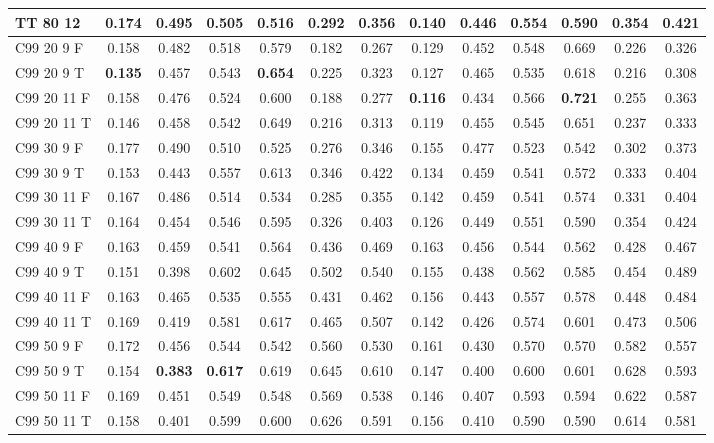 \documentclass{article}
\begin{document}
\begin{longtable}[c]{|l|c|c|c|c|c|c||c|c|c|c|c|c|}
TT 80 12 & 0.174 & 0.495 & 0.505 & 0.516 & 0.292 & 0.356 & 0.140 & 0.446 & 0.554 & 0.590 & 0.354 & 0.421\\ \hline\hline
C99 20  9 F & 0.158 & 0.482 & 0.518 & 0.579 & 0.182 & 0.267 & 0.129 & 0.452 & 0.548 & 0.669 & 0.226 & 0.326\\ \hline
C99 20  9 T & \textbf{0.135} & 0.457 & 0.543 & \textbf{0.654} & 0.225 & 0.323 & 0.127 & 0.465 & 0.535 & 0.618 & 0.216 & 0.308\\ \hline
C99 20 11 F & 0.158 & 0.476 & 0.524 & 0.600 & 0.188 & 0.277 & \textbf{0.116} & 0.434 & 0.566 & \textbf{0.721} & 0.255 & 0.363\\ \hline
C99 20 11 T & 0.146 & 0.458 & 0.542 & 0.649 & 0.216 & 0.313 & 0.119 & 0.455 & 0.545 & 0.651 & 0.237 & 0.333\\ \hline
C99 30  9 F & 0.177 & 0.490 & 0.510 & 0.525 & 0.276 & 0.346 & 0.155 & 0.477 & 0.523 & 0.542 & 0.302 & 0.373\\ \hline
C99 30  9 T & 0.153 & 0.443 & 0.557 & 0.613 & 0.346 & 0.422 & 0.134 & 0.459 & 0.541 & 0.572 & 0.333 & 0.404\\ \hline
C99 30 11 F & 0.167 & 0.486 & 0.514 & 0.534 & 0.285 & 0.355 & 0.142 & 0.459 & 0.541 & 0.574 & 0.331 & 0.404\\ \hline
C99 30 11 T & 0.164 & 0.454 & 0.546 & 0.595 & 0.326 & 0.403 & 0.126 & 0.449 & 0.551 & 0.590 & 0.354 & 0.424\\ \hline
C99 40  9 F & 0.163 & 0.459 & 0.541 & 0.564 & 0.436 & 0.469 & 0.163 & 0.456 & 0.544 & 0.562 & 0.428 & 0.467\\ \hline
C99 40  9 T & 0.151 & 0.398 & 0.602 & 0.645 & 0.502 & 0.540 & 0.155 & 0.438 & 0.562 & 0.585 & 0.454 & 0.489\\ \hline
C99 40 11 F & 0.163 & 0.465 & 0.535 & 0.555 & 0.431 & 0.462 & 0.156 & 0.443 & 0.557 & 0.578 & 0.448 & 0.484\\ \hline
C99 40 11 T & 0.169 & 0.419 & 0.581 & 0.617 & 0.465 & 0.507 & 0.142 & 0.426 & 0.574 & 0.601 & 0.473 & 0.506\\ \hline
C99 50  9 F & 0.172 & 0.456 & 0.544 & 0.542 & 0.560 & 0.530 & 0.161 & 0.430 & 0.570 & 0.570 & 0.582 & 0.557\\ \hline
C99 50  9 T & 0.154 & \textbf{0.383} & \textbf{0.617} & 0.619 & 0.645 & 0.610 & 0.147 & 0.400 & 0.600 & 0.601 & 0.628 & 0.593\\ \hline
C99 50 11 F & 0.169 & 0.451 & 0.549 & 0.548 & 0.569 & 0.538 & 0.146 & 0.407 & 0.593 & 0.594 & 0.622 & 0.587\\ \hline
C99 50 11 T & 0.158 & 0.401 & 0.599 & 0.600 & 0.626 & 0.591 & 0.156 & 0.410 & 0.590 & 0.590 & 0.614 & 0.581\\ \hline

\end{longtable}
\end{document}
